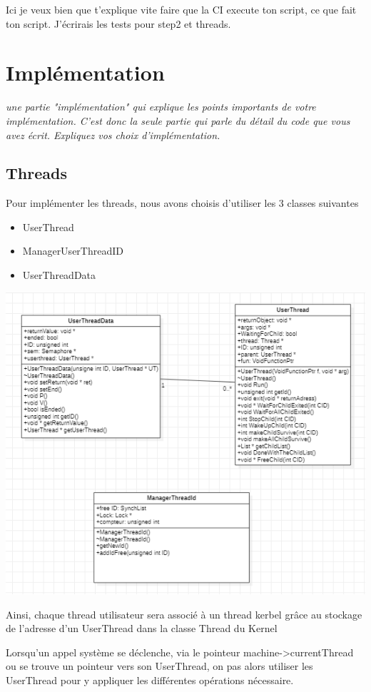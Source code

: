 \documentclass{article}
\begin{document}
Ici je veux bien que t'explique vite faire que la CI execute ton script, ce que fait ton script. J'écrirais les tests pour step2 et threads.

\newpage
\section{Implémentation}
\textit{une partie "implémentation" qui explique les points importants de votre implémentation. C'est donc la seule partie qui parle du détail du code que vous avez écrit. Expliquez vos choix d'implémentation.
}
\vspace{5mm}

\subsection{Threads}

Pour implémenter les threads, nous avons choisis d'utiliser les 3 classes suivantes
\begin{itemize}
\item
UserThread
\item
ManagerUserThreadID
\item
UserThreadData
\end{itemize}
\includegraphics{code/userprog/UserThread.PNG}

Ainsi, chaque thread utilisateur sera associé à un thread kerbel grâce au stockage de l'adresse d'un UserThread dans la classe Thread du Kernel


Lorsqu'un appel système se déclenche, via le pointeur machine->currentThread ou se trouve un pointeur vers son UserThread, on pas alors utiliser les UserThread pour y appliquer les différentes opérations nécessaire.
\vspace{5mm}
\end{document}
